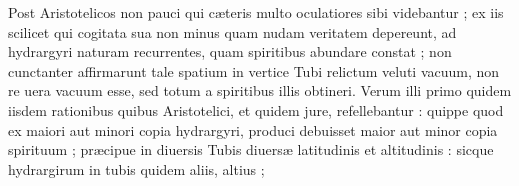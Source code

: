 \documentclass[11pt,a4paper]{article}
\begin{document}
Post Aristotelicos non pauci qui cæteris multo oculatiores  sibi videbantur ; ex iis scilicet qui cogitata sua non minus quam nudam veritatem depereunt, ad hydrargyri naturam recurrentes, quam spiritibus abundare constat ; non cunctanter affirmarunt tale spatium in vertice Tubi relictum veluti vacuum, non re uera vacuum esse, sed totum a spiritibus illis obtineri. Verum illi primo quidem iisdem rationibus quibus Aristotelici, et quidem jure, refellebantur : quippe quod ex maiori aut minori copia hydrargyri, produci debuisset maior aut minor copia spirituum ; præcipue in diuersis Tubis diuersæ latitudinis et altitudinis : sicque hydrargirum in tubis quidem aliis, altius ;
\end{document}
